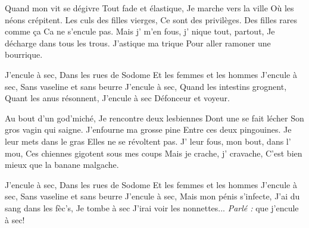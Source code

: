 \footnotemark [
ititle={J'encule à sec},
tu={Je marche seul (Jean-Jacques Goldman)}]


\beginverse
Quand mon vit se dégivre
Tout fade et élastique,
Je marche vers la ville
Où les néons crépitent.
Les culs des filles vierges,
Ce sont des privilèges.
Des filles rares comme ça
Ca ne s'encule pas.
Mais j' m'en fous, j' nique tout, partout,
Je décharge dans tous les trous.
J'astique ma trique
Pour aller ramoner une bourrique.
\endverse

\beginchorus
J'encule à sec,
Dans les rues de Sodome
Et les femmes et les hommes
J'encule à sec,
Sans vaseline et sans beurre
J'encule à sec,
Quand les intestins grognent,
Quant les anus résonnent,
J'encule à sec
Défonceur et voyeur.
\endchorus

Au bout d'un god'miché,
Je rencontre deux lesbiennes
Dont une se fait lécher
Son gros vagin qui saigne.
J'enfourne ma grosse pine
Entre ces deux pingouines.
Je leur mets dans le gras
Elles ne se révoltent pas.
J' leur fous, mon bout, dans l' mou,
Ces chiennes gigotent sous mes coups
Mais je crache, j' cravache,
C'est bien mieux que la banane malgache.
\endverse

\beginchorus
J'encule à sec,
Dans les rues de Sodome
Et les femmes et les hommes
J'encule à sec,
Sans vaseline et sans beurre
J'encule à sec,
Mais mon pénis s'infecte,
J'ai du sang dans les fèc's,
Je tombe à sec
J'irai voir les nonnettes... \emph{Parlé :} que j'encule à sec!
\endchorus
\endsong
